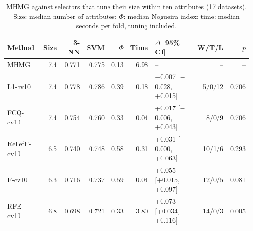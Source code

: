 \begin{table}[!t]
\centering
\caption{MHMG against selectors that tune their size within ten attributes (17 datasets). Size: median number of
attributes; $\Phi$: median Nogueira index; time: median seconds per fold, tuning included.}
\label{tab:ten}
\footnotesize
\begin{tabular*}{\textwidth}{@{\extracolsep{\fill}}lrrrrrlrr@{}}
\toprule
Method & Size & 3-NN & SVM & $\Phi$ & Time & $\Delta$ [95\% CI] & W/T/L & $p$ \\
\midrule
MHMG & 7.4 & 0.771 & 0.775 & 0.13 & 6.98 & -- & -- & -- \\
L1-cv10 & 7.4 & 0.778 & 0.786 & 0.39 & 0.18 & $-$0.007 [$-$0.028, +0.015] & 5/0/12 & 0.706 \\
FCQ-cv10 & 7.4 & 0.754 & 0.760 & 0.33 & 0.04 & +0.017 [$-$0.006, +0.043] & 8/0/9 & 0.706 \\
ReliefF-cv10 & 6.5 & 0.740 & 0.748 & 0.58 & 0.31 & +0.031 [$-$0.000, +0.063] & 10/1/6 & 0.293 \\
F-cv10 & 6.3 & 0.716 & 0.737 & 0.59 & 0.04 & +0.055 [+0.015, +0.097] & 12/0/5 & 0.081 \\
RFE-cv10 & 6.8 & 0.698 & 0.721 & 0.33 & 3.80 & +0.073 [+0.034, +0.116] & 14/0/3 & 0.005 \\
\bottomrule
\end{tabular*}
\end{table}
